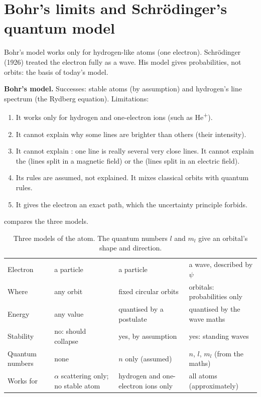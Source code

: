 \section{Bohr's limits and Schrödinger's quantum model}\label{ch3:sec:schrodinger}

\begin{bigidea}
Bohr's model works only for hydrogen-like atoms (one electron). Schrödinger (1926) treated the electron fully as a wave.
His model gives probabilities, not orbits: the basis of today's model.
\end{bigidea}

\textbf{Bohr's model.} Successes: stable atoms (by assumption) and hydrogen's line spectrum
(the Rydberg equation). Limitations:
\begin{enumerate}
  \item It works only for hydrogen and one-electron ions (such as He\textsuperscript{+}).
  \item It cannot explain why some lines are brighter than others (their intensity).
  \item It cannot explain : one line is really several very close lines.
        It cannot explain the  (lines split in a magnetic field) or the
         (lines split in an electric field).
  \item Its rules are assumed, not explained. It mixes classical orbits with quantum rules.
  \item It gives the electron an exact path, which the uncertainty principle forbids.
\end{enumerate}

 compares the three models.

\begin{table}
  \caption{Three models of the atom. The quantum numbers $l$ and $m_l$ give an orbital's shape
    and direction.}\label{ch3:tab:models}
  \centering
  \small
  \begin{tabular}{@{}L{21mm}L{36mm}L{38mm}L{42mm}@{}}
    \toprule
    &  &  & \\
    \midrule
    Electron & a particle & a particle & a wave, described by $\psi$\\
    Where & any orbit & fixed circular orbits & orbitals: probabilities only\\
    Energy & any value & quantised by a postulate & quantised by the wave maths\\
    Stability & no: should collapse & yes, by assumption & yes: standing waves\\
    Quantum numbers & none & $n$ only (assumed) & $n$, $l$, $m_l$ (from the maths)\\
    Works for & $\alpha$ scattering only; no stable atom & hydrogen and one-electron ions
      only & all atoms
      (approximately)\\
    \bottomrule
  \end{tabular}
\end{table}

